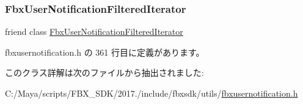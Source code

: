 \subsubsection{\texorpdfstring{Fbx\+User\+Notification\+Filtered\+Iterator}{FbxUserNotificationFilteredIterator}}
{\footnotesize\ttfamily friend class \hyperlink{class_fbx_user_notification_filtered_iterator}{Fbx\+User\+Notification\+Filtered\+Iterator}\hspace{0.3cm}{\ttfamily [friend]}}



 fbxusernotification.\+h の 361 行目に定義があります。



このクラス詳解は次のファイルから抽出されました\+:\begin{DoxyCompactItemize}
\item 
C\+:/\+Maya/scripts/\+F\+B\+X\+\_\+\+S\+D\+K/2017./include/fbxsdk/utils/\hyperlink{fbxusernotification_8h}{fbxusernotification.\+h}\end{DoxyCompactItemize}
